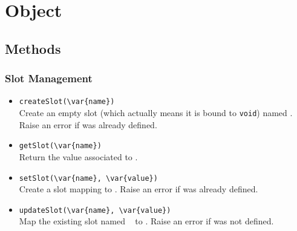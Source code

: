 \section{Object}

\subsection{Methods}

\subsubsection{Slot Management}

\begin{itemize}
\item \lstinline|createSlot(\var{name})|\\
  Create an empty slot (which actually means it is bound to
  \lstinline|void|) named .  Raise an error if 
  was already defined.

\item \lstinline|getSlot(\var{name})|\\
  Return the value associated to .

\item \lstinline|setSlot(\var{name}, \var{value})|\\
  Create a slot  mapping to . Raise an error if
   was already defined.

\item \lstinline|updateSlot(\var{name}, \var{value})|\\
  Map the existing slot named \  to . Raise an
  error if  was not defined.
\end{itemize}

